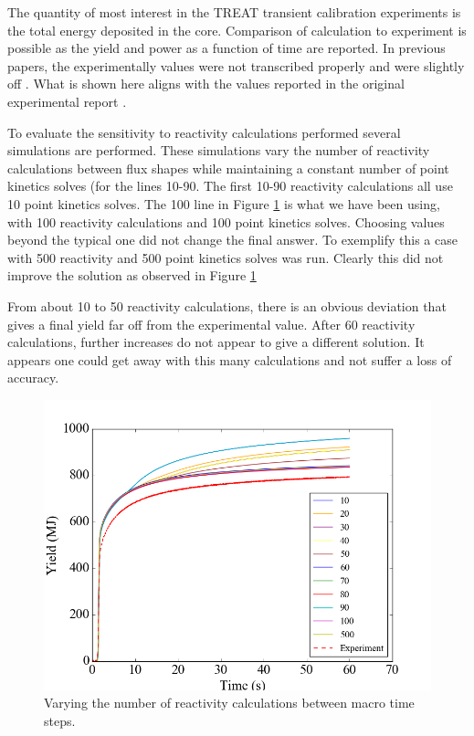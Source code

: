 \documentclass{anstrans}
\begin{document}
   The quantity of most interest in the TREAT transient calibration experiments is the total energy deposited in the core.  Comparison of calculation to experiment is possible as the yield and power as a function of time are reported.  In previous  papers, the experimentally values were not transcribed properly and were slightly off \cite{physor_mausolff}\cite{physor_paluch}.  What is shown here aligns with the values reported in the original experimental report \cite{Robinson_Bauer_1994}. 
   
   To evaluate the sensitivity to reactivity calculations performed several simulations are performed.  These simulations vary the number of reactivity calculations between flux shapes while maintaining a constant number of point kinetics solves (for the lines 10-90.  The first 10-90 reactivity calculations all use 10 point kinetics solves.  The 100 line in Figure \ref{fig:ptkinvar} is what we have been using, with 100 reactivity calculations and 100 point kinetics solves. Choosing values beyond the typical one did not change the final answer.  To exemplify this a case with  500 reactivity and 500 point kinetics solves was run. Clearly this did not improve the solution as observed in Figure \ref{fig:ptkinvar}
   
   From about 10 to 50 reactivity calculations, there is an obvious deviation that gives a final yield far off from the experimental value.  After 60 reactivity calculations, further increases do not appear to give a different solution.  It appears one could get away with this many calculations and not suffer a loss of accuracy.

\begin{figure}[h]
    \centering
    \includegraphics[width = 9 cm]{figures/ptkinvar.png}
    \caption{Varying the number of reactivity calculations between macro time steps.}
    \label{fig:ptkinvar}
\end{figure}
\end{document}
